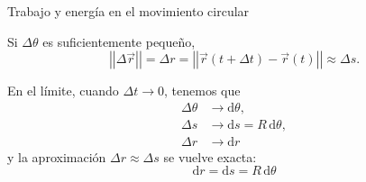 \documentclass[11pt,handout,aspectratio=1610]{beamer}
\newcommand{\norm}[1]{\left\vert\left\vert #1 \right\vert\right\vert}
\begin{document}
\begin{frame}{Trabajo y energía en el movimiento circular}
            
    Si $\Delta \theta$ es suficientemente pequeño, $$\norm{\Delta \vec{r}} = \Delta r = \norm{\vec{r} (t+\Delta t) - \vec{r} (t)} \approx \Delta s .$$

    En el límite, cuando $\Delta t \to 0$, tenemos que 
    \begin{align*}
    \Delta \theta & \to \text{d}\theta, \\
    \Delta s & \to \text{d} s = R \, \text{d} \theta, \\
    \Delta r & \to \text{d} r 
    \end{align*} y la aproximación $\Delta r \approx \Delta s$ se vuelve exacta: $$\text{d} r = \text{d} s = R \, \text{d} \theta$$

\end{frame}
\end{document}
